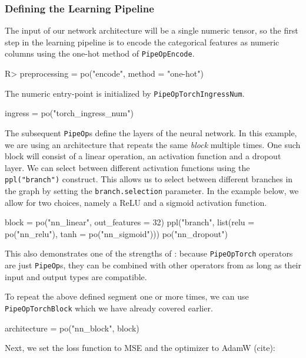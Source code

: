 \documentclass[article, nojss]{jss}
\theoremstyle{definition}
\begin{document}
\subsubsection{Defining the Learning Pipeline}
The input of our network architecture will be a single numeric tensor, so the first step in the learning pipeline is to encode the categorical features as numeric columns using the one-hot method of \texttt{PipeOpEncode}.

\begin{CodeInput}
R> preprocessing = po("encode", method = "one-hot")
\end{CodeInput}

The numeric entry-point is initialized by \texttt{PipeOpTorchIngressNum}.

\begin{CodeInput}
ingress = po("torch_ingress_num")
\end{CodeInput}

The subsequent \texttt{PipeOp}s define the layers of the neural network.
In this example, we are using an architecture that repeats the same \textit{block} multiple times.
One such block will consist of a linear operation, an activation function and a dropout layer.
We can select between different activation functions using the \texttt{ppl("branch")} construct.
This allows us to select between different branches in the graph by setting the \texttt{branch.selection} parameter.
In the example below, we allow for two choices, namely a ReLU and a sigmoid activation function.

\begin{CodeInput}
block = po("nn_linear", out_features = 32) %
  ppl("branch", list(relu = po("nn_relu"), tanh = po("nn_sigmoid"))) %
  po("nn_dropout")
\end{CodeInput}

This also demonstrates one of the strengths of : because \texttt{PipeOpTorch} operators are just \texttt{PipeOp}s, they can be combined with other operators from  as long as their input and output types are compatible.

To repeat the above defined segment one or more times, we can use \texttt{PipeOpTorchBlock} which we have already covered earlier.

\begin{CodeInput}
architecture = po("nn_block", block)
\end{CodeInput}

Next, we set the loss function to MSE and the optimizer to AdamW (cite):
\end{document}

